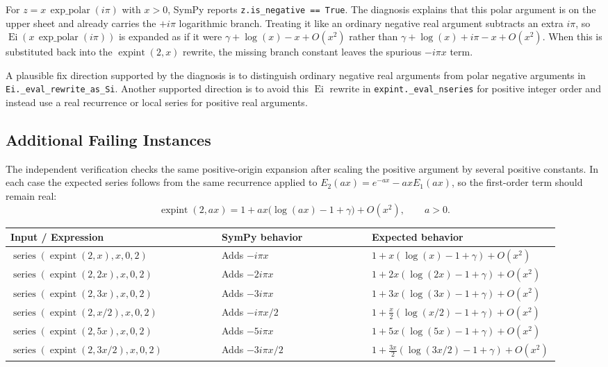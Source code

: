 \documentclass[11pt]{article}
\begin{document}
For \(z=x\,\operatorname{exp\_polar}(i\pi)\) with \(x>0\), SymPy reports
\texttt{z.is\_negative == True}.  The diagnosis explains that this polar
argument is on the upper sheet and already carries the \(+i\pi\) logarithmic
branch.  Treating it like an ordinary negative real argument subtracts an extra
\(i\pi\), so
\(\operatorname{Ei}(x\,\operatorname{exp\_polar}(i\pi))\) is expanded as if it
were \(\gamma+\log(x)-x+O(x^2)\) rather than
\(\gamma+\log(x)+i\pi-x+O(x^2)\).  When this is substituted back into the
\(\operatorname{expint}(2,x)\) rewrite, the missing branch constant leaves the
spurious \(-i\pi x\) term.

A plausible fix direction supported by the diagnosis is to distinguish ordinary
negative real arguments from polar negative arguments in
\texttt{Ei.\_eval\_rewrite\_as\_Si}.  Another supported direction is to avoid
this \(\operatorname{Ei}\) rewrite in \texttt{expint.\_eval\_nseries} for
positive integer order and instead use a real recurrence or local series for
positive real arguments.

\subsection{Additional Failing Instances}

The independent verification checks the same positive-origin expansion after
scaling the positive argument by several positive constants.  In each case the
expected series follows from the same recurrence applied to
\(E_2(a x)=e^{-a x}-a x E_1(a x)\), so the first-order term should remain real:
\[
  \operatorname{expint}(2,a x)
  = 1 + a x\bigl(\log(a x)-1+\gamma\bigr) + O(x^2),
  \qquad a>0.
\]

\begin{center}
\small
\renewcommand{\arraystretch}{1.3}
\begin{tabular}{@{}>{\raggedright\arraybackslash}p{0.38\linewidth}>{\raggedright\arraybackslash}p{0.27\linewidth}>{\raggedright\arraybackslash}p{0.27\linewidth}@{}}
\toprule
\textbf{Input / Expression} & \textbf{SymPy behavior} & \textbf{Expected behavior} \\
\midrule
\(\operatorname{series}(\operatorname{expint}(2,x),x,0,2)\) &
Adds \(-i\pi x\) &
\(1+x(\log(x)-1+\gamma)+O(x^2)\) \\
\(\operatorname{series}(\operatorname{expint}(2,2x),x,0,2)\) &
Adds \(-2i\pi x\) &
\(1+2x(\log(2x)-1+\gamma)+O(x^2)\) \\
\(\operatorname{series}(\operatorname{expint}(2,3x),x,0,2)\) &
Adds \(-3i\pi x\) &
\(1+3x(\log(3x)-1+\gamma)+O(x^2)\) \\
\(\operatorname{series}(\operatorname{expint}(2,x/2),x,0,2)\) &
Adds \(-i\pi x/2\) &
\(1+\frac{x}{2}(\log(x/2)-1+\gamma)+O(x^2)\) \\
\(\operatorname{series}(\operatorname{expint}(2,5x),x,0,2)\) &
Adds \(-5i\pi x\) &
\(1+5x(\log(5x)-1+\gamma)+O(x^2)\) \\
\(\operatorname{series}(\operatorname{expint}(2,3x/2),x,0,2)\) &
Adds \(-3i\pi x/2\) &
\(1+\frac{3x}{2}(\log(3x/2)-1+\gamma)+O(x^2)\) \\
\bottomrule
\end{tabular}
\end{center}
\end{document}
